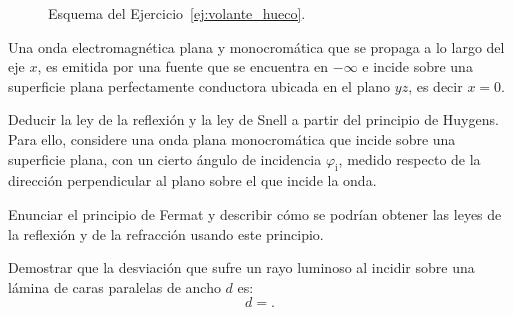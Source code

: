 \documentclass[addpoints]{exam}
\begin{document}
\begin{questions}
\begin{figure}[ht]
        \caption{Esquema del Ejercicio~\ref{ej:volante_hueco}.}
        \label{fig:volante_hueco}
    \end{figure}

    \pagebreak

    \question Una onda electromagnética plana y monocromática que se propaga a lo largo del eje $x$, es emitida por una fuente que se encuentra en $-\infty$ e incide sobre una superficie plana perfectamente conductora ubicada en el plano $yz$, es decir $x=0$.

    \question Deducir la ley de la reflexión y la ley de Snell a partir del principio de Huygens. Para ello, considere una onda plana monocromática que incide sobre una superficie plana, con un cierto ángulo de incidencia $\varphi_\text{i}$, medido respecto de la dirección perpendicular al plano sobre el que incide la onda.

    \question Enunciar el principio de Fermat y describir cómo se podrían obtener las leyes de la reflexión y de la refracción usando este principio.

    \question Demostrar que la desviación que sufre un rayo luminoso al incidir sobre una lámina de caras paralelas de ancho $d$ es: $$ d = .$$

\end{questions}
\end{document}
